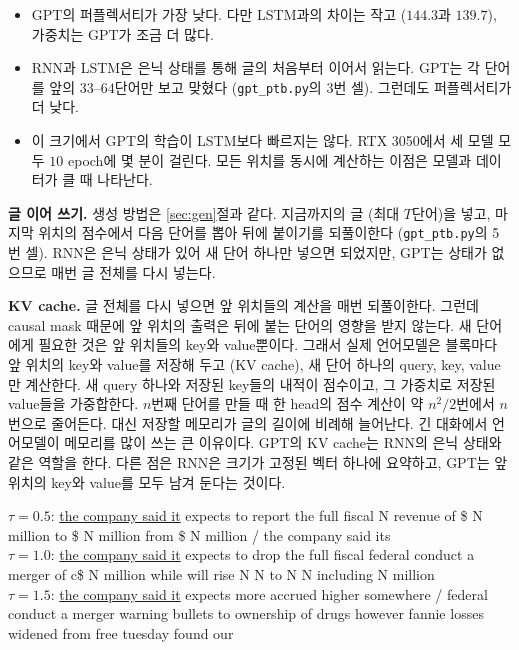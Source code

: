 \documentclass[11pt,a4paper]{article}
\begin{document}
\begin{itemize}[leftmargin=1.5em]
\item GPT의 퍼플렉서티가 가장 낮다. 다만 LSTM과의 차이는 작고 ($144.3$과 $139.7$), 가중치는 GPT가 조금 더 많다.
\item RNN과 LSTM은 은닉 상태를 통해 글의 처음부터 이어서 읽는다. GPT는 각 단어를 앞의 $33$--$64$단어만 보고 맞혔다 (\texttt{gpt\_ptb.py}의 3번 셀). 그런데도 퍼플렉서티가 더 낮다.
\item 이 크기에서 GPT의 학습이 LSTM보다 빠르지는 않다. RTX 3050에서 세 모델 모두 $10$ epoch에 몇 분이 걸린다. 모든 위치를 동시에 계산하는 이점은 모델과 데이터가 클 때 나타난다.
\end{itemize}

\textbf{글 이어 쓰기.} 생성 방법은 \ref{sec:gen}절과 같다. 지금까지의 글 (최대 $T$단어)을 넣고, 마지막 위치의 점수에서 다음 단어를 뽑아 뒤에 붙이기를 되풀이한다 (\texttt{gpt\_ptb.py}의 5번 셀).
RNN은 은닉 상태가 있어 새 단어 하나만 넣으면 되었지만, GPT는 상태가 없으므로 매번 글 전체를 다시 넣는다.

\textbf{KV cache.} 글 전체를 다시 넣으면 앞 위치들의 계산을 매번 되풀이한다. 그런데 causal mask 때문에 앞 위치의 출력은 뒤에 붙는 단어의 영향을 받지 않는다.
새 단어에게 필요한 것은 앞 위치들의 key와 value뿐이다. 그래서 실제 언어모델은 블록마다 앞 위치의 key와 value를 저장해 두고 (KV cache), 새 단어 하나의 query, key, value만 계산한다.
새 query 하나와 저장된 key들의 내적이 점수이고, 그 가중치로 저장된 value들을 가중합한다.
$n$번째 단어를 만들 때 한 head의 점수 계산이 약 $n^2/2$번에서 $n$번으로 줄어든다. 대신 저장할 메모리가 글의 길이에 비례해 늘어난다. 긴 대화에서 언어모델이 메모리를 많이 쓰는 큰 이유이다.
GPT의 KV cache는 RNN의 은닉 상태와 같은 역할을 한다. 다른 점은 RNN은 크기가 고정된 벡터 하나에 요약하고, GPT는 앞 위치의 key와 value를 모두 남겨 둔다는 것이다.

\begin{remarkbox}
\ttfamily\small\raggedright
\textrm{$\tau=0.5$:} \underline{the company said it} expects to report the full fiscal N revenue of \$ N million to \$ N million from \$ N million / the company said its\\[0.4em]
\textrm{$\tau=1.0$:} \underline{the company said it} expects to drop the full fiscal federal conduct a merger of c\$ N million while will rise N N to N N including N million\\[0.4em]
\textrm{$\tau=1.5$:} \underline{the company said it} expects more accrued higher somewhere / federal conduct a merger warning bullets to ownership of drugs however fannie losses widened from free tuesday found our
\end{remarkbox}
\end{document}
